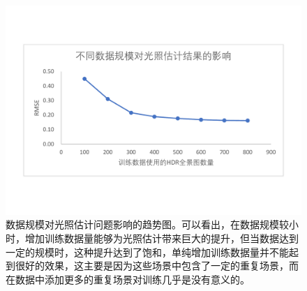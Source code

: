 \begin{figure}[!htbp]
    \centering
    \includegraphics[width=1.0\textwidth]{Img/eval-data-size.pdf}
    \caption[数据规模对光照估计问题影响的趋势图]
    {数据规模对光照估计问题影响的趋势图。可以看出，在数据规模较小时，增加训练数据量能够为光照估计带来巨大的提升，但当数据达到一定的规模时，这种提升达到了饱和，单纯增加训练数据量并不能起到很好的效果，这主要是因为这些场景中包含了一定的重复场景，而在数据中添加更多的重复场景对训练几乎是没有意义的。}
    \label{fig:eval-data-size}
\end{figure}